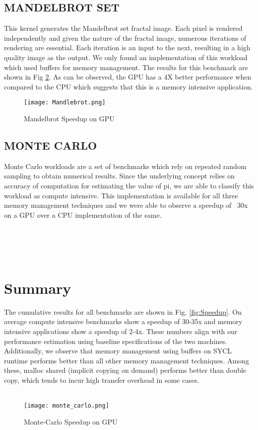 \documentclass[14pt,fleqn]{article}
\begin{document}
\subsection{MANDELBROT SET}
This kernel generates the Mandelbrot set fractal image. Each pixel is rendered independently and given the nature of the fractal image, numerous iterations of rendering are essential. Each iteration is an input to the next, resulting in a high quality image as the output. We only found an implementation of this workload which used buffers for memory management. The results for this benchmark are shown in Fig \ref{fig:Mandlebrot}. As can be observed, the GPU has a 4X better performance when compared to the CPU which suggests that this is a memory intensive application.
\begin{figure}
\centering
    \texttt{[image: Mandlebrot.png]}
    \caption{Mandelbrot Speedup on GPU}
    \label{fig:Mandlebrot}
\end{figure}
\subsection{MONTE CARLO}
Monte Carlo workloads are a set of benchmarks which rely on repeated random sampling to obtain numerical results. Since the underlying concept relies on accuracy of computation for estimating the value of pi, we are able to classify this workload as compute intensive. This implementation is available for all three memory management techniques and we were able to observe a speedup of ~30x on a GPU over a CPU implementation of the same. \\\\\\\\\
\section{Summary}
The cumulative results for all benchmarks are shown in Fig. \ref{fig:Speedup}. On average compute intensive benchmarks show a speedup of 30-35x and memory intensive applications show a speedup of 2-4x. These numbers align with our performance estimation using baseline specifications of the two machines. Additionally, we observe that memory management using buffers on SYCL runtime performs better than all other memory management techniques. Among these, malloc shared (implicit copying on demand) performs better than double copy, which tends to incur high transfer overhead in some cases.\\\\
\begin{figure}
\centering
    \texttt{[image: monte\_carlo.png]}
    \caption{Monte-Carlo Speedup on GPU}
    \label{fig:Mandlebrot}
\end{figure}
\end{document}

